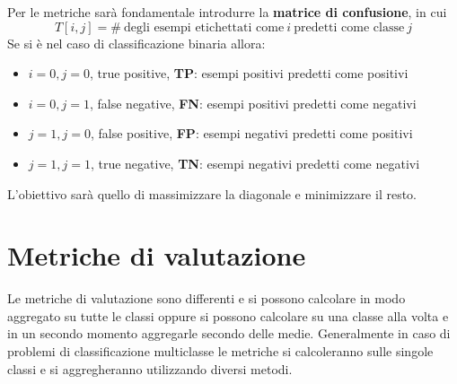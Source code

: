Per le metriche sarà fondamentale introdurre la \textbf{matrice di confusione}, in cui 
\begin{equation}
    T[i,j] = \# \ \text{degli esempi etichettati come} \ i \ \text{predetti come classe} \ j
\end{equation}
Se si è nel caso di classificazione binaria allora:
\begin{itemize}
    \item $i=0, j=0$, true positive, \textbf{TP}: esempi positivi predetti come positivi
    \item $i=0, j=1$, false negative, \textbf{FN}: esempi positivi predetti come negativi
    \item $j=1, j=0$, false positive, \textbf{FP}: esempi negativi predetti come positivi
    \item $j=1, j=1$, true negative, \textbf{TN}: esempi negativi predetti come negativi 
\end{itemize}
L'obiettivo sarà quello di massimizzare la diagonale e minimizzare il resto.
\section{Metriche di valutazione}
Le metriche di valutazione sono differenti e si possono calcolare in modo aggregato
su tutte le classi oppure si possono calcolare su una classe alla volta e in un 
secondo momento aggregarle secondo delle medie. Generalmente in caso di problemi
di classificazione multiclasse le metriche si calcoleranno sulle singole classi e
si aggregheranno utilizzando diversi metodi.

